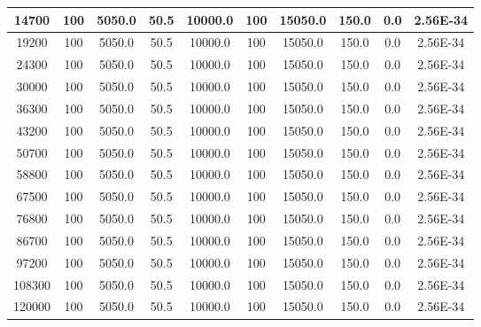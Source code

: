 \begin{tabular}{|c|c|c|c|c|c|c|c|c|c|}
14700 & 100 & 5050.0 & 50.5 & 10000.0 & 100 & 15050.0 & 150.0 & 0.0 & 2.56E-34\\ \hline
19200 & 100 & 5050.0 & 50.5 & 10000.0 & 100 & 15050.0 & 150.0 & 0.0 & 2.56E-34\\ \hline
24300 & 100 & 5050.0 & 50.5 & 10000.0 & 100 & 15050.0 & 150.0 & 0.0 & 2.56E-34\\ \hline
30000 & 100 & 5050.0 & 50.5 & 10000.0 & 100 & 15050.0 & 150.0 & 0.0 & 2.56E-34\\ \hline
36300 & 100 & 5050.0 & 50.5 & 10000.0 & 100 & 15050.0 & 150.0 & 0.0 & 2.56E-34\\ \hline
43200 & 100 & 5050.0 & 50.5 & 10000.0 & 100 & 15050.0 & 150.0 & 0.0 & 2.56E-34\\ \hline
50700 & 100 & 5050.0 & 50.5 & 10000.0 & 100 & 15050.0 & 150.0 & 0.0 & 2.56E-34\\ \hline
58800 & 100 & 5050.0 & 50.5 & 10000.0 & 100 & 15050.0 & 150.0 & 0.0 & 2.56E-34\\ \hline
67500 & 100 & 5050.0 & 50.5 & 10000.0 & 100 & 15050.0 & 150.0 & 0.0 & 2.56E-34\\ \hline
76800 & 100 & 5050.0 & 50.5 & 10000.0 & 100 & 15050.0 & 150.0 & 0.0 & 2.56E-34\\ \hline
86700 & 100 & 5050.0 & 50.5 & 10000.0 & 100 & 15050.0 & 150.0 & 0.0 & 2.56E-34\\ \hline
97200 & 100 & 5050.0 & 50.5 & 10000.0 & 100 & 15050.0 & 150.0 & 0.0 & 2.56E-34\\ \hline
108300 & 100 & 5050.0 & 50.5 & 10000.0 & 100 & 15050.0 & 150.0 & 0.0 & 2.56E-34\\ \hline
120000 & 100 & 5050.0 & 50.5 & 10000.0 & 100 & 15050.0 & 150.0 & 0.0 & 2.56E-34\\ \hline
\end{tabular}